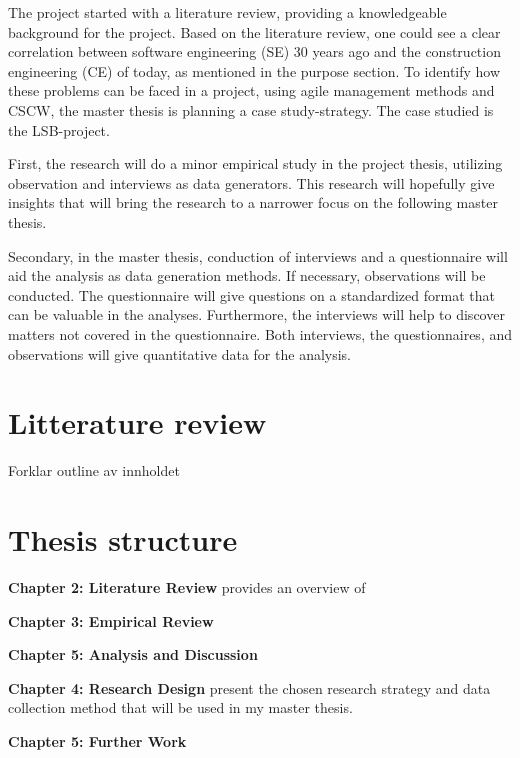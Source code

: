 The project started with a literature review, providing a knowledgeable background for the project. Based on the literature review, one could see a clear correlation between software engineering (SE) 30 years ago and the construction engineering (CE) of today, as mentioned in the purpose section. To identify how these problems can be faced in a project, using agile management methods and CSCW, the master thesis is planning a case study-strategy. The case studied is the LSB-project. 

First, the research will do a minor empirical study in the project thesis, utilizing observation and interviews as data generators. This research will hopefully give insights that will bring the research to a narrower focus on the following master thesis. 

Secondary, in the master thesis, conduction of interviews and a questionnaire will aid the analysis as data generation methods. If necessary, observations will be conducted. The questionnaire will give questions on a standardized format that can be valuable in the analyses. Furthermore, the interviews will help to discover matters not covered in the questionnaire. Both interviews, the questionnaires, and observations will give quantitative data for the analysis.
\section{Litterature review} \label{sec:litterature}
Forklar outline av innholdet
\section{Thesis structure} \label{sec:thesis}

{\bf Chapter 2: Literature Review} provides an overview of 

{\bf Chapter 3: Empirical Review}

{\bf Chapter 5: Analysis and Discussion}

{\bf Chapter 4: Research Design} present the chosen research strategy and data collection method that will be used in my master thesis. 

{\bf Chapter 5: Further Work} 

\cleardoublepage